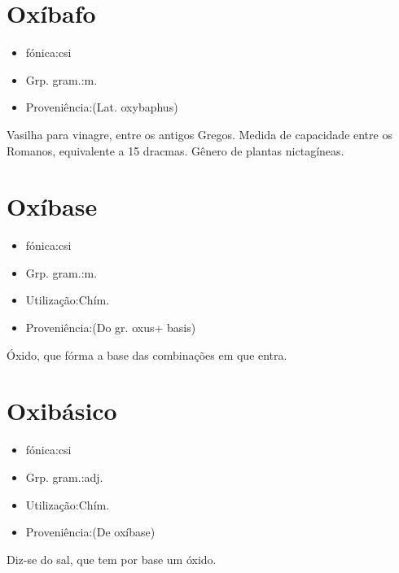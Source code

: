 \section{Oxíbafo}
\begin{itemize}
\item {fónica:csi}
\end{itemize}
\begin{itemize}
\item {Grp. gram.:m.}
\end{itemize}
\begin{itemize}
\item {Proveniência:(Lat. \textunderscore oxybaphus\textunderscore )}
\end{itemize}
Vasilha para vinagre, entre os antigos Gregos.
Medida de capacidade entre os Romanos, equivalente a 15 dracmas.
Gênero de plantas nictagíneas.
\section{Oxíbase}
\begin{itemize}
\item {fónica:csi}
\end{itemize}
\begin{itemize}
\item {Grp. gram.:m.}
\end{itemize}
\begin{itemize}
\item {Utilização:Chím.}
\end{itemize}
\begin{itemize}
\item {Proveniência:(Do gr. \textunderscore oxus\textunderscore  + \textunderscore basis\textunderscore )}
\end{itemize}
Óxido, que fórma a base das combinações em que entra.
\section{Oxibásico}
\begin{itemize}
\item {fónica:csi}
\end{itemize}
\begin{itemize}
\item {Grp. gram.:adj.}
\end{itemize}
\begin{itemize}
\item {Utilização:Chím.}
\end{itemize}
\begin{itemize}
\item {Proveniência:(De \textunderscore oxíbase\textunderscore )}
\end{itemize}
Diz-se do sal, que tem por base um óxido.
